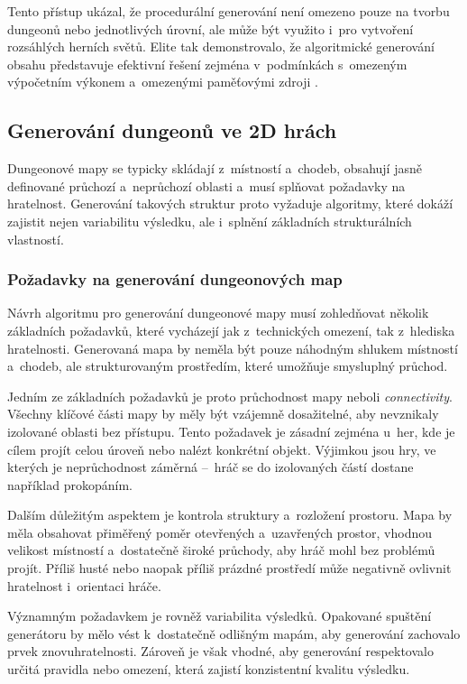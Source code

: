 \documentclass[
   program=itk,
   biblatex,
   figures=true,
   tables=true,
   glossaries,
   index
]{kidiplom}
\begin{document}
Tento přístup ukázal, že procedurální generování není omezeno pouze na tvorbu dungeonů nebo jednotlivých úrovní, ale může být využito i~pro vytvoření rozsáhlých herních světů. Elite tak demonstrovalo, že algoritmické generování obsahu představuje efektivní řešení zejména v~podmínkách s~omezeným výpočetním výkonem a~omezenými paměťovými zdroji \cite{EliteWiki}.

\subsection{Generování dungeonů ve 2D hrách}
Dungeonové mapy se typicky skládají z~místností a~chodeb, obsahují jasně definované průchozí a~neprůchozí oblasti a~musí splňovat požadavky na hratelnost. Generování takových struktur proto vyžaduje algoritmy, které dokáží zajistit nejen variabilitu výsledku, ale i~splnění základních strukturálních vlastností.

\subsubsection{Požadavky na generování dungeonových map}
Návrh algoritmu pro generování dungeonové mapy musí zohledňovat několik základních požadavků, které vycházejí jak z~technických omezení, tak z~hlediska hratelnosti. Generovaná mapa by neměla být pouze náhodným shlukem místností a~chodeb, ale strukturovaným prostředím, které umožňuje smysluplný průchod.

Jedním ze základních požadavků je proto průchodnost mapy neboli \textit{connectivity}.
Všechny klíčové části mapy by měly být vzájemně dosažitelné, aby nevznikaly izolované oblasti bez přístupu.
Tento požadavek je zásadní zejména u~her, kde je cílem projít celou úroveň nebo nalézt konkrétní objekt. Výjimkou jsou hry, ve kterých je neprůchodnost záměrná –~hráč se do izolovaných částí dostane například prokopáním.

Dalším důležitým aspektem je kontrola struktury a~rozložení prostoru. Mapa by měla obsahovat přiměřený poměr otevřených a~uzavřených prostor, vhodnou velikost místností a~dostatečně široké průchody, aby hráč mohl bez problémů projít. Příliš husté nebo naopak příliš prázdné prostředí může negativně ovlivnit hratelnost i~orientaci hráče.

Významným požadavkem je rovněž variabilita výsledků. Opakované spuštění generátoru by mělo vést k~dostatečně odlišným mapám, aby generování zachovalo prvek znovuhratelnosti. Zároveň je však vhodné, aby generování respektovalo určitá pravidla nebo omezení, která zajistí konzistentní kvalitu výsledku.
\end{document}
